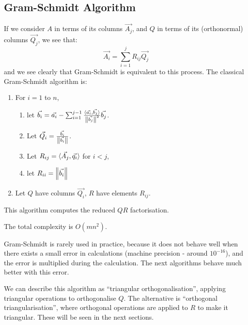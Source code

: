 \documentclass[../Main.tex]{subfiles}
\begin{document}
\subsection{Gram-Schmidt Algorithm}
If we consider $A$ in terms of its columns $\vec{A_j}$, and $Q$ in terms of its (orthonormal) columns $\vec{Q_j}$, we see that:
\begin{equation*}
    \vec{A_i} = \sum_{i=1}^{j} R_{ij} \vec{Q_j}
\end{equation*}
and we see clearly that Gram-Schmidt is equivalent to this process. The classical Gram-Schmidt algorithm is:
\begin{enumerate}
    \item For $i = 1$ to $n$,
    \begin{enumerate}
        \item let $\vec{b_i} = \vec{a_i} - \sum_{i = 1}^{j-1} \frac{\langle\vec{a_i},\vec{b_j}\rangle}{\left\|\vec{b_j}\right\|^2}\vec{b_j}$.
        \item Let $\vec{Q_i} = \frac{\vec{b_i}}{\left\|\vec{b_i}\right\|}$.
        \item Let $R_{ij} = \langle\vec{A_j},\vec{q_i}\rangle$ for $i < j$,
        \item let $R_{ii} = \left\|\vec{b_i}\right\|$
    \end{enumerate}
    \item Let $Q$ have columns $\vec{Q_i}$, $R$ have elements $R_{ij}$.
\end{enumerate}
\begin{remarks}
    \item This algorithm computes the reduced $QR$ factorisation.
    \item The total complexity is $O(mn^2)$.
    \item Gram-Schmidt is rarely used in practice, because it does not behave well when there exists a small error in calculations (machine precision - around $10^{-16}$), and the error is multiplied during the calculation. The next algorithms behave much better with this error.
    \item We can describe this algorithm as ``triangular orthogonalisation'', applying triangular operations to orthogonalise $Q$. The alternative is ``orthogonal triangularisation'', where orthogonal operations are applied to $R$ to make it triangular. These will be seen in the next sections.
\end{remarks}
\end{document}
